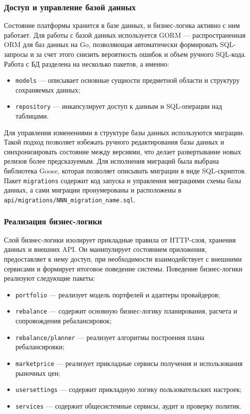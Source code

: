\documentclass[14pt]{gost-7-32}
\begin{document}
\subsubsection{Доступ и управление базой данных}

Состояние платформы хранится в базе данных, и бизнес-логика активно с ним работает. Для работы с базой данных используется GORM --- распространенная ORM для баз данных на Go, позволяющая автоматически формировать SQL-запросы и за счет этого снизить вероятность ошибок и объем ручного SQL-кода. Работа с БД разделена на несколько пакетов, а именно:

\begin{itemize}
  \item \verb|models| --- описывает основные сущности предметной области и структуру сохраняемых данных;
  \item \verb|repository| --- инкапсулирует доступ к данным и SQL-операции над таблицами.
\end{itemize}

Для управления изменениями в структуре базы данных используются миграции. Такой подход позволяет избежать ручного редактирования базы данных и синхронизировать состояние между версиями, что делает развертывание новых релизов более предсказуемым. Для исполнения миграций была выбрана библиотека Goose, которая позволяет описывать миграции в виде SQL-скриптов. Пакет \verb|migrations| содержит код запуска и управления миграциями схемы базы данных, а сами миграции пронумерованы и расположены в \texttt{api/migrations/NNN\_migration\_name.sql}.

\subsubsection{Реализация бизнес-логики}

Слой бизнес-логики изолирует прикладные правила от HTTP-слоя, хранения данных и внешних API. Он манипулирует состоянием приложения, предоставляет к нему доступ, при необходимости взаимодействует с внешними сервисами и формирует итоговое поведение системы. Поведение бизнес-логики реализуют следующие пакеты:

\begin{itemize}
  \item \verb|portfolio| --- реализует модель портфелей и адаптеры провайдеров;
  \item \verb|rebalance| --- содержит основную бизнес-логику планирования, расчета и сопровождения ребалансировок;
  \item \verb|rebalance/planner| --- реализует алгоритмы построения плана ребалансировки;
  \item \verb|marketprice| --- реализует прикладные сервисы получения и использования рыночных цен;
  \item \verb|usersettings| --- содержит прикладную логику пользовательских настроек;
  \item \verb|services| --- содержит общесистемные сервисы, аудит и проверку политик.
\end{itemize}
\end{document}
